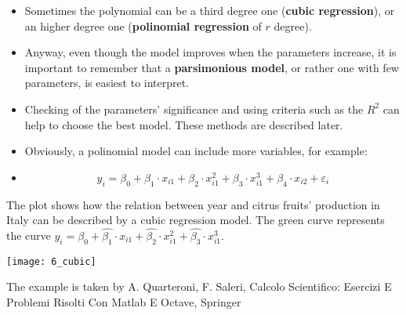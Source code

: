 \begin{frame}
  \vspace{0.25cm}
  \begin{itemize}
    \item Sometimes the polynomial can be a third degree one (\textbf{cubic regression}), or an higher degree one (\textbf{polinomial regression} of $ r $ degree).
    \vspace{0.15cm}
    \item Anyway, even though the model improves when the parameters increase, it is important to remember that a \textbf{parsimonious model}, or rather one with few parameters, is easiest to interpret.
    \vspace{0.15cm}
    \item Checking of the parameters' significance and using criteria such as the $ R^2 $ can help to choose the best model. These methods are described later.
    \vspace{0.15cm}
    \item Obviously, a polinomial model can include more variables, for example:
    \item[] \vspace{-0.6cm} $$ y_i = \beta_0 + \beta_1 \cdot x_{i1} + \beta_2 \cdot x_{i1}^2 + \beta_3 \cdot x_{i1}^3 + \beta_4 \cdot x_{i2} + \varepsilon_i $$ \vspace{-0.8cm}
  \end{itemize}
\end{frame}

\begin{frame}
  The plot shows how the relation between year and citrus fruits' production in Italy can be described by a cubic regression model. The green curve represents the curve $ y_i = \hat{\beta_0} + \hat{\beta_1} \cdot x_{i1} + \hat{\beta_2} \cdot x_{i1}^2 + \hat{\beta_3} \cdot x_{i1}^3 $. 
  \begin{center}
    \texttt{[image: 6\_cubic]}
  \end{center}
  \vspace{-0.3cm}
  \begin{tiny}
    The example is taken by A. Quarteroni, F. Saleri, Calcolo Scientifico: Esercizi E Problemi Risolti Con Matlab E Octave, Springer
  \end{tiny}
\end{frame}


